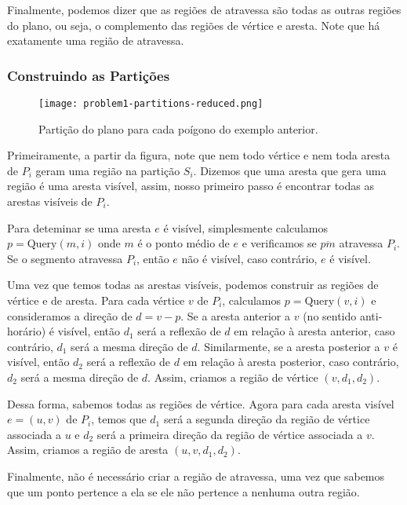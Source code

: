 \documentclass{article}
\begin{document}
Finalmente, podemos dizer que as regiões de atravessa são todas as outras regiões do plano, ou seja, o complemento das regiões de vértice e aresta. Note que há exatamente uma região de atravessa.

\subsubsection{Construindo as Partições}

\begin{wrapfigure}{r}{0.60\textwidth}

\vspace{-15pt}
\centering
\texttt{[image: problem1-partitions-reduced.png]}
\caption{Partição do plano para cada poígono do exemplo anterior.}

\end{wrapfigure}

Primeiramente, a partir da figura, note que nem todo vértice e nem toda aresta de \(P_i\) geram uma região na partição \(S_i\). Dizemos que uma aresta que gera uma região é uma aresta visível, assim, nosso primeiro passo é encontrar todas as arestas visíveis de \(P_i\). 

Para deteminar se uma aresta \(e\) é visível, simplesmente calculamos \(p = \text{Query}(m, i)\) onde \(m\) é o ponto médio de \(e\) e verificamos se \(\overline{pm}\) atravessa \(P_i\). Se o segmento atravessa \(P_i\), então \(e\) não é visível, caso contrário, \(e\) é visível.

Uma vez que temos todas as arestas visíveis, podemos construir as regiões de vértice e de aresta. Para cada vértice \(v\) de \(P_i\), calculamos \(p = \text{Query}(v, i)\) e consideramos a direção de \(d = v - p\).
Se a aresta anterior a \(v\) (no sentido anti-horário) é visível, então \(d_1\) será a reflexão de \(d\) em relação à aresta anterior, caso contrário, \(d_1\) será a mesma direção de \(d\). Similarmente, se a aresta posterior a \(v\) é visível, então \(d_2\) será a reflexão de \(d\) em relação à aresta posterior, caso contrário, \(d_2\) será a mesma direção de \(d\). Assim, criamos a região de vértice \((v, d_1, d_2)\).

Dessa forma, sabemos todas as regiões de vértice. Agora para cada aresta visível \(e = (u, v)\) de \(P_i\), temos que \(d_1\) será a segunda direção da região de vértice associada a \(u\) e \(d_2\) será a primeira direção da região de vértice associada a \(v\). Assim, criamos a região de aresta \((u, v, d_1, d_2)\).

Finalmente, não é necessário criar a região de atravessa, uma vez que sabemos que um ponto pertence a ela se ele não pertence a nenhuma outra região.



\end{document}
